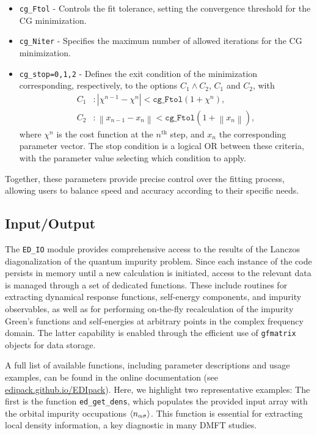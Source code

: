 \documentclass[edipack_sp.tex]{subfiles}
\begin{document}
\begin{itemize}
{diagonalization modes entail nontrivial subtleties in optimizing 
the off-diagonal components of $X$.}
\item \texttt{cg\_Ftol} - Controls the fit tolerance, setting the 
convergence threshold for the CG minimization.
\item \texttt{cg\_Niter} - Specifies the maximum number of allowed 
iterations for the CG minimization.
\item \texttt{cg\_stop=0,1,2} - Defines the exit condition of the 
minimization corresponding, respectively, to the options  $C_1\land C_2$, $C_1$ and $C_2$, with
\begin{align*}
C_1 & : |\chi^{n-1} - \chi^n| < \mathtt{cg\_Ftol} (1+\chi^n), \\
C_2 & : \left\|x_{n-1} - x_n\right\| < 
\mathtt{cg\_Ftol} (1+\left\|x_n\right\|),
\end{align*}
where $\chi^n$ is the cost function at the $n^\mathrm{th}$ step, and 
$x_n$ the corresponding parameter vector. The stop condition is a 
logical OR between these criteria, with the parameter value selecting 
which condition to apply.
\end{itemize}

Together, these parameters provide precise control over the fitting 
process, allowing users to balance speed and accuracy according to 
their specific needs.



\subsection{Input/Output}\label{sSecIO}
The \texttt{ED\_IO} module provides comprehensive access to the 
results of the Lanczos diagonalization of the quantum impurity 
problem. Since each instance of the code persists in memory until a 
new calculation is initiated, access to the relevant data is managed 
through a set of dedicated functions. These include routines for 
extracting dynamical response functions, self-energy components, and 
impurity observables, as well as for performing on-the-fly 
recalculation of the impurity Green's functions and self-energies at 
arbitrary points in the complex frequency domain. The latter 
capability is enabled through the efficient use of \texttt{gfmatrix} 
objects for data storage.

A full list of available functions, including parameter descriptions 
and usage examples, can be found in the online documentation (see \href{https://edipack.github.io/EDIpack/}{edipack.github.io/EDIpack}).  
Here, we highlight two representative examples:
The first is the function \texttt{ed\_get\_dens}, which populates the 
provided input array with the orbital impurity occupations 
$\langle n_{\alpha\sigma}\rangle$. This function is essential for extracting 
local density information, a key diagnostic in many DMFT studies.
\end{document}
